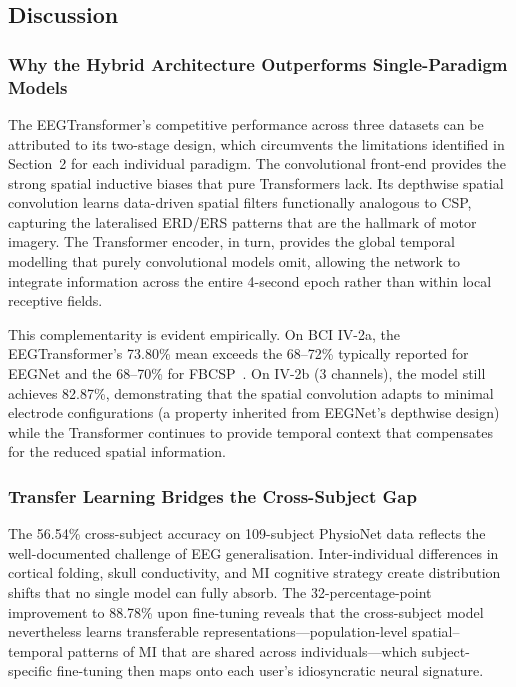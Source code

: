 \documentclass[12pt, a4paper]{article}
\begin{document}
\subsection{Discussion}

\subsubsection{Why the Hybrid Architecture Outperforms Single-Paradigm Models}
\label{sec:disc_hybrid}

The EEGTransformer's competitive performance across three datasets can be attributed to its two-stage design, which circumvents the limitations identified in Section~2 for each individual paradigm. The convolutional front-end provides the strong spatial inductive biases that pure Transformers lack. Its depthwise spatial convolution learns data-driven spatial filters functionally analogous to CSP, capturing the lateralised ERD/ERS patterns that are the hallmark of motor imagery. The Transformer encoder, in turn, provides the global temporal modelling that purely convolutional models omit, allowing the network to integrate information across the entire 4-second epoch rather than within local receptive fields.

This complementarity is evident empirically. On BCI IV-2a, the EEGTransformer's 73.80\% mean exceeds the 68--72\% typically reported for EEGNet and the 68--70\% for FBCSP~\cite{hameed2025enhancing}. On IV-2b (3 channels), the model still achieves 82.87\%, demonstrating that the spatial convolution adapts to minimal electrode configurations (a property inherited from EEGNet's depthwise design) while the Transformer continues to provide temporal context that compensates for the reduced spatial information.

\subsubsection{Transfer Learning Bridges the Cross-Subject Gap}

The 56.54\% cross-subject accuracy on 109-subject PhysioNet data reflects the well-documented challenge of EEG generalisation. Inter-individual differences in cortical folding, skull conductivity, and MI cognitive strategy create distribution shifts that no single model can fully absorb. The 32-percentage-point improvement to 88.78\% upon fine-tuning reveals that the cross-subject model nevertheless learns transferable representations---population-level spatial--temporal patterns of MI that are shared across individuals---which subject-specific fine-tuning then maps onto each user's idiosyncratic neural signature.
\end{document}

